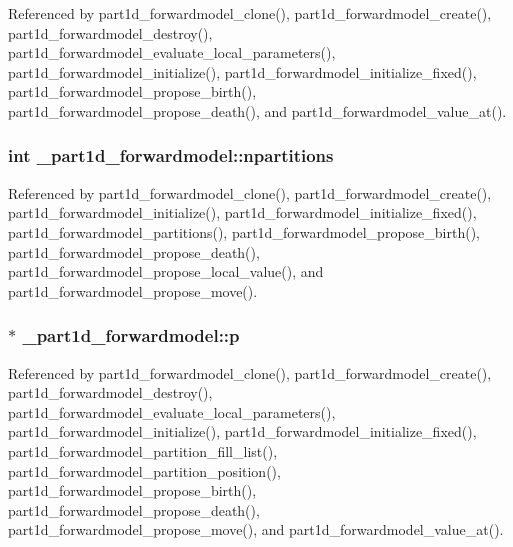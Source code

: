 Referenced by part1d\+\_\+forwardmodel\+\_\+clone(), part1d\+\_\+forwardmodel\+\_\+create(), part1d\+\_\+forwardmodel\+\_\+destroy(), part1d\+\_\+forwardmodel\+\_\+evaluate\+\_\+local\+\_\+parameters(), part1d\+\_\+forwardmodel\+\_\+initialize(), part1d\+\_\+forwardmodel\+\_\+initialize\+\_\+fixed(), part1d\+\_\+forwardmodel\+\_\+propose\+\_\+birth(), part1d\+\_\+forwardmodel\+\_\+propose\+\_\+death(), and part1d\+\_\+forwardmodel\+\_\+value\+\_\+at().

\subsubsection[{\texorpdfstring{npartitions}{npartitions}}]{\setlength{\rightskip}{0pt plus 5cm}int \+\_\+part1d\+\_\+forwardmodel\+::npartitions}\hypertarget{struct__part1d__forwardmodel_ae447d08e8086f98014ecd8f361f0b2e8}{}\label{struct__part1d__forwardmodel_ae447d08e8086f98014ecd8f361f0b2e8}


Referenced by part1d\+\_\+forwardmodel\+\_\+clone(), part1d\+\_\+forwardmodel\+\_\+create(), part1d\+\_\+forwardmodel\+\_\+initialize(), part1d\+\_\+forwardmodel\+\_\+initialize\+\_\+fixed(), part1d\+\_\+forwardmodel\+\_\+partitions(), part1d\+\_\+forwardmodel\+\_\+propose\+\_\+birth(), part1d\+\_\+forwardmodel\+\_\+propose\+\_\+death(), part1d\+\_\+forwardmodel\+\_\+propose\+\_\+local\+\_\+value(), and part1d\+\_\+forwardmodel\+\_\+propose\+\_\+move().

\subsubsection[{\texorpdfstring{p}{p}}]{$\ast$ \+\_\+part1d\+\_\+forwardmodel\+::p}\hypertarget{struct__part1d__forwardmodel_a64820eb69c2a4089f3bb45d47b1bcd2e}{}\label{struct__part1d__forwardmodel_a64820eb69c2a4089f3bb45d47b1bcd2e}


Referenced by part1d\+\_\+forwardmodel\+\_\+clone(), part1d\+\_\+forwardmodel\+\_\+create(), part1d\+\_\+forwardmodel\+\_\+destroy(), part1d\+\_\+forwardmodel\+\_\+evaluate\+\_\+local\+\_\+parameters(), part1d\+\_\+forwardmodel\+\_\+initialize(), part1d\+\_\+forwardmodel\+\_\+initialize\+\_\+fixed(), part1d\+\_\+forwardmodel\+\_\+partition\+\_\+fill\+\_\+list(), part1d\+\_\+forwardmodel\+\_\+partition\+\_\+position(), part1d\+\_\+forwardmodel\+\_\+propose\+\_\+birth(), part1d\+\_\+forwardmodel\+\_\+propose\+\_\+death(), part1d\+\_\+forwardmodel\+\_\+propose\+\_\+move(), and part1d\+\_\+forwardmodel\+\_\+value\+\_\+at().

